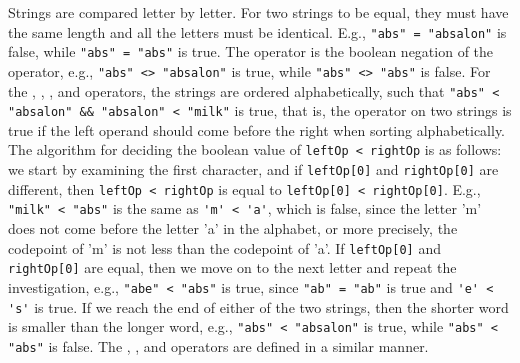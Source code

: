 \documentclass[fsharpNotes.tex]{subfiles}
\begin{document}
Strings are compared letter by letter. For two strings to be equal, they must have the same length and all the letters must be identical. E.g., \mbox{\lstinline!"abs" = "absalon"!} is false, while \lstinline!"abs" = "abs"! is true. The \lexeme{<>} operator is the boolean negation of the \lexeme{=} operator, e.g., \lstinline!"abs" <> "absalon"! is true, while \lstinline!"abs" <> "abs"! is false. For the \lexeme{<} , \lexeme{<=}, \lexeme{>}, and \lexeme{>=} operators, the strings are ordered alphabetically, such that \lstinline!"abs" < "absalon" && "absalon" < "milk"! is true, that is, the \lexeme{<} operator on two strings is true if the left operand should come before the right when sorting alphabetically. The algorithm for deciding the boolean value of \lstinline!leftOp < rightOp! is as follows: we start by examining the first character, and if \lstinline!leftOp[0]! and \lstinline!rightOp[0]! are different, then \lstinline!leftOp < rightOp! is equal to \lstinline!leftOp[0] < rightOp[0]!. E.g., \lstinline!"milk" < "abs"! is the same as \lstinline!'m' < 'a'!, which is false, since the letter 'm' does not come before the letter 'a' in the alphabet, or more precisely, the codepoint of 'm' is not less than the codepoint of 'a'. If \lstinline!leftOp[0]! and \lstinline!rightOp[0]! are equal, then we move on to the next letter and repeat the investigation, e.g., \lstinline!"abe" < "abs"! is true, since \lstinline!"ab" = "ab"! is true and \lstinline!'e' < 's'! is true. If we reach the end of either of the two strings, then the shorter word is smaller than the longer word, e.g., \lstinline!"abs" < "absalon"! is true, while \lstinline!"abs" < "abs"! is false. The \lexeme{<=}, \lexeme{>}, and \lexeme{>=} operators are defined in a similar manner.
\end{document}

